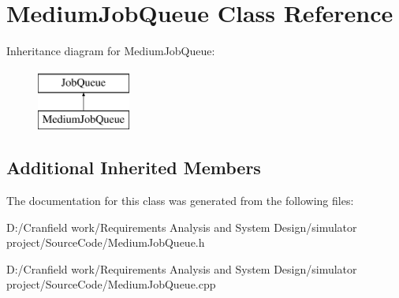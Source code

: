 \hypertarget{class_medium_job_queue}{}\section{Medium\+Job\+Queue Class Reference}
\label{class_medium_job_queue}
Inheritance diagram for Medium\+Job\+Queue\+:\begin{figure}[H]
\begin{center}
\leavevmode
\includegraphics[height=2.000000cm]{class_medium_job_queue}
\end{center}
\end{figure}
\subsection*{Additional Inherited Members}


The documentation for this class was generated from the following files\+:\begin{DoxyCompactItemize}
\item 
D\+:/\+Cranfield work/\+Requirements Analysis and System Design/simulator project/\+Source\+Code/Medium\+Job\+Queue.\+h\item 
D\+:/\+Cranfield work/\+Requirements Analysis and System Design/simulator project/\+Source\+Code/Medium\+Job\+Queue.\+cpp\end{DoxyCompactItemize}
